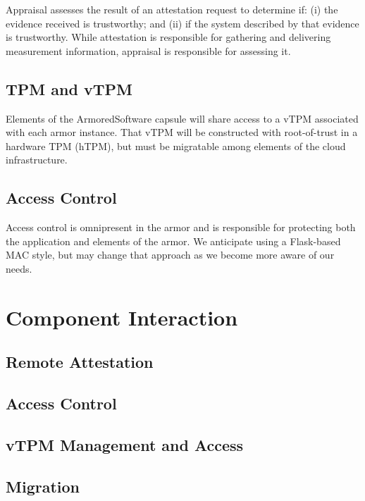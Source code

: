 \documentclass[10pt]{article}
\begin{document}
Appraisal assesses the result of an attestation request to determine
if: (i) the evidence received is trustworthy; and (ii) if the
system described by that evidence is trustworthy.  While attestation
is responsible for gathering and delivering measurement information,
appraisal is responsible for assessing it.

\subsection{TPM and vTPM}

Elements of the ArmoredSoftware capsule will share access to a vTPM
associated with each armor instance.  That vTPM will be constructed with
root-of-trust in a hardware TPM (hTPM), but must be migratable among
elements of the cloud infrastructure.

\subsection{Access Control}

Access control is omnipresent in the armor and is responsible for
protecting both the application and elements of the armor.  We
anticipate using a Flask-based MAC style, but may change that approach
as we become more aware of our needs.

\section{Component Interaction}

\subsection{Remote Attestation}

\subsection{Access Control}

\subsection{vTPM Management and Access}

\subsection{Migration}
\end{document}
